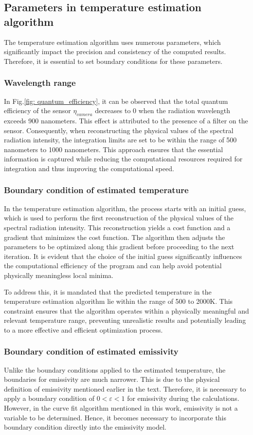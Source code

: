 \subsection{Parameters in temperature estimation algorithm}
The temperature estimation algorithm uses numerous parameters, 
which significantly impact the precision and consistency of the 
computed results. Therefore, it is essential to set boundary conditions 
for these parameters.


\subsubsection{Wavelength range}
In Fig.\ref{fig: quantum_efficiency}, it can be observed that the 
total quantum efficiency of the sensor $\eta_{camera}$ decreases to 
0 when the radiation wavelength exceeds 900 nanometers. This effect is 
attributed to the presence of a filter on the sensor. Consequently, 
when reconstructing the physical values of the spectral radiation 
intensity, the integration limits are set to be within the 
range of 500 nanometers to 1000 nanometers. This approach ensures 
that the essential information is captured while reducing the 
computational resources required for integration and thus improving the 
computational speed.


\subsubsection{Boundary condition of estimated temperature}
In the temperature estimation algorithm, the process starts with an 
initial guess, which is used to perform the first reconstruction of 
the physical values of the spectral radiation intensity. This 
reconstruction yields a cost function and a gradient that 
minimizes the cost function. The algorithm then adjusts the parameters 
to be optimized along this gradient before proceeding to the next 
iteration. It is evident that the choice of the initial guess 
significantly influences the computational efficiency of the 
program and can help avoid potential physically meaningless 
local minima.

To address this, it is mandated that the predicted temperature in the 
temperature estimation algorithm lie within the range of 500 to 2000K. 
This constraint ensures that the algorithm operates within a 
physically meaningful and relevant temperature range, preventing 
unrealistic results and potentially leading to a more effective and 
efficient optimization process.

\subsubsection{Boundary condition of estimated emissivity}
Unlike the boundary conditions applied to the estimated temperature, 
the boundaries for emissivity are much narrower. This is due to the 
physical definition of emissivity mentioned earlier in the text. 
Therefore, it is necessary to apply a boundary condition 
of $0 < \varepsilon < 1$ for emissivity during the calculations. 
However, in the curve fit algorithm mentioned in this work, emissivity 
is not a variable to be determined. Hence, it becomes necessary to 
incorporate this boundary condition directly into the emissivity model.